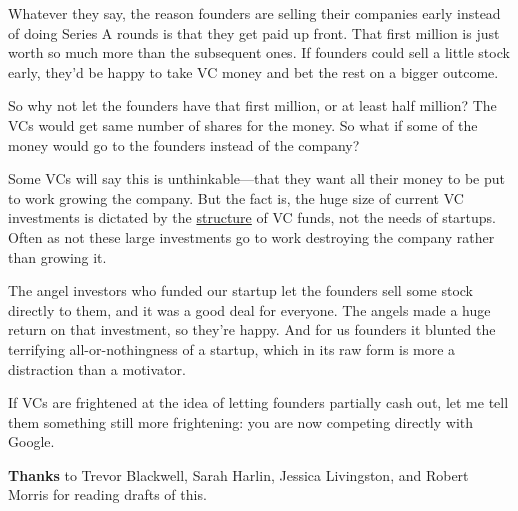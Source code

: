 Whatever they say, the reason founders are selling their companies early
instead of doing Series A rounds is that they get paid up front. That
first million is just worth so much more than the subsequent ones. If
founders could sell a little stock early, they'd be happy to take VC
money and bet the rest on a bigger outcome.

So why not let the founders have that first million, or at least half
million? The VCs would get same number of shares for the money. So what
if some of the money would go to the founders instead of the company?

Some VCs will say this is unthinkable---that they want all their money
to be put to work growing the company. But the fact is, the huge size of
current VC investments is dictated by the
\href{venturecapital.html}{structure} of VC funds, not the needs of
startups. Often as not these large investments go to work destroying the
company rather than growing it.

The angel investors who funded our startup let the founders sell some
stock directly to them, and it was a good deal for everyone. The angels
made a huge return on that investment, so they're happy. And for us
founders it blunted the terrifying all-or-nothingness of a startup,
which in its raw form is more a distraction than a motivator.

If VCs are frightened at the idea of letting founders partially cash
out, let me tell them something still more frightening: you are now
competing directly with Google.

\textbf{Thanks} to Trevor Blackwell, Sarah Harlin, Jessica Livingston,
and Robert Morris for reading drafts of this.